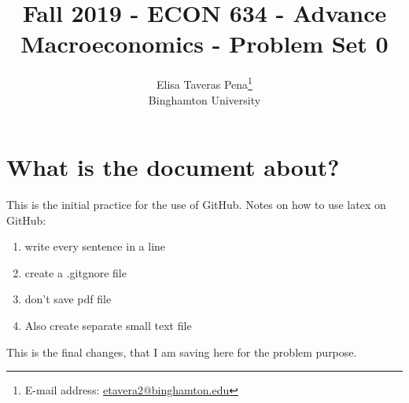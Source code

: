 \documentclass[12pt]{article}%
\begin{document}
\title{Fall 2019 - ECON 634 - Advance Macroeconomics - Problem Set 0}
\author{Elisa Taveras Pena\footnote{E-mail address: \href{mailto:etavera2@binghamton.edu}{etavera2@binghamton.edu}  }\\
Binghamton University}
\maketitle

\sloppy%

\onehalfspacing

\section{What is the document about?}

This is the initial practice for the use of GitHub. Notes on how to use latex on GitHub:

\begin{enumerate}
\item write every sentence in a line
\item create a .gitgnore file 
\item don't save pdf file
\item Also create separate small text file
\end{enumerate}

This is the final changes, that I am saving here for the problem purpose.


\onehalfspacing
\end{document}
